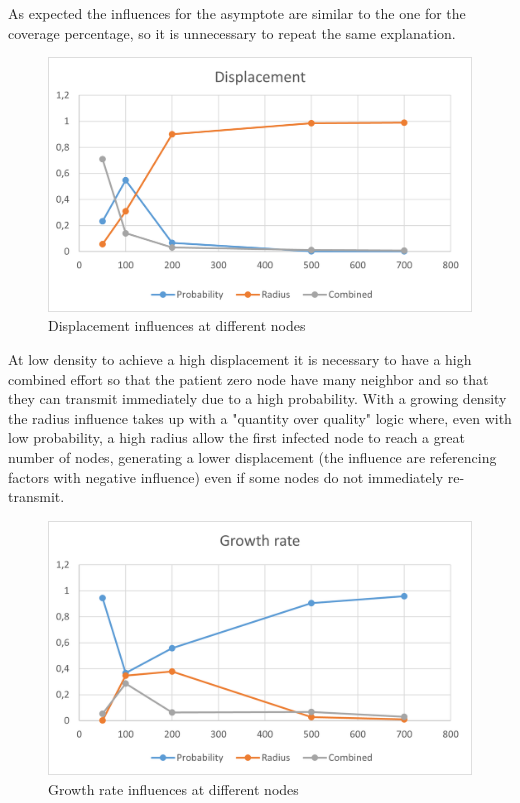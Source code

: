 As expected the influences for the asymptote are similar to the one for the coverage percentage, so it is unnecessary to repeat the same explanation.

\begin{figure}[H]\label{pic:DisplacementNodes}
\centering
    \includegraphics[width= 1\textwidth]{./images/DisplacementWithNodes.png}
    \caption{Displacement influences at different nodes}
\end{figure}

At low density to achieve a high displacement it is necessary to have a high combined effort so that the patient zero node have many neighbor and so that they can transmit immediately due to a high probability. With a growing density the radius influence takes up with a "quantity over quality" logic where, even with low probability, a high radius allow the first infected node to reach a great number of nodes, generating a lower displacement (the influence are referencing factors with negative influence) even if some nodes do not immediately re-transmit.

\begin{figure}[H]\label{pic:GrowthRatesNodes}
\centering
    \includegraphics[width= 1\textwidth]{./images/GrowthRateWithNodes.png}
    \caption{Growth rate influences at different nodes}
\end{figure}

